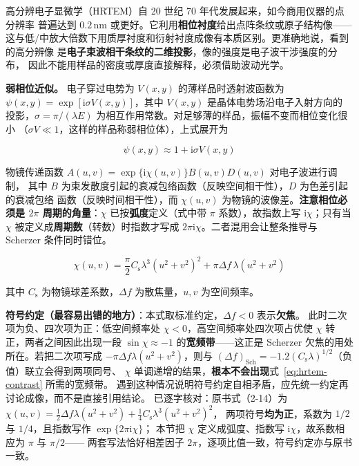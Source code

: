高分辨电子显微学（HRTEM）自 20 世纪 70 年代发展起来，如今商用仪器的点分辨率
普遍达到 $0.2$\,nm 或更好。它利用\textbf{相位衬度}给出点阵条纹或原子结构像——
这与低/中放大倍数下用质厚衬度和衍射衬度成像有本质区别。更准确地说，看到的高分辨像
是\textbf{电子束波相干条纹的二维投影}，像的强度是电子波干涉强度的分布，
因此不能用样品的密度或厚度直接解释，必须借助波动光学。

\textbf{弱相位近似。} 电子穿过电势为 $V(x,y)$ 的薄样品时透射波函数为
$\psi(x,y)=\exp[\mathrm{i}\sigma V(x,y)]$，其中 $V(x,y)$ 是晶体电势场沿电子入射方向的
投影，$\sigma=\pi/(\lambda E)$ 为相互作用常数。对足够薄的样品，振幅不变而相位变化很小
（$\sigma V\ll1$，这样的样品称弱相位体），上式展开为

\begin{equation}\label{eq:weak-phase}
\psi(x,y)\approx 1+\mathrm{i}\sigma V(x,y)
\end{equation}

物镜传递函数 $A(u,v)=\exp\{\mathrm{i}\chi(u,v)\}B(u,v)D(u,v)$ 对电子波进行调制，
其中 $B$ 为束发散度引起的衰减包络函数（反映空间相干性），$D$ 为色差引起的衰减包络
函数（反映时间相干性），而 $\chi(u,v)$ 为物镜的波像差。\textbf{注意相位必须是
$2\pi$ 周期的角量}：$\chi$ 已按\textbf{弧度}定义（式中带 $\pi$ 系数），故指数上写
$\mathrm{i}\chi$；只有当 $\chi$ 被定义成\textbf{周期数}（转数）时指数才写成
$2\pi\mathrm{i}\chi$。二者混用会让整条推导与 Scherzer 条件同时错位。

\begin{equation}\label{eq:chi}
\chi(u,v)=\frac{\pi}{2}C_{\mathrm{s}}\lambda^{3}(u^{2}+v^{2})^{2}
+\pi\Delta f\,\lambda(u^{2}+v^{2})
\end{equation}

其中 $C_{\mathrm{s}}$ 为物镜球差系数，$\Delta f$ 为散焦量，$u,v$ 为空间频率。

\textbf{符号约定（最容易出错的地方）}：本式取标准约定，$\Delta f<0$ 表示\textbf{欠焦}。
此时二次项为负、四次项为正：低空间频率处 $\chi<0$，高空间频率处四次项占优使 $\chi$
转正，两者之间因此出现一段 $\sin\chi\approx-1$ 的\textbf{宽频带}——这正是 Scherzer
欠焦的用处所在。若把二次项写成 $-\pi\Delta f\lambda(u^{2}+v^{2})$，则与
$(\Delta f)_{\mathrm{Sch}}=-1.2(C_{\mathrm{s}}\lambda)^{1/2}$（负值）联立会得到两项同号、
$\chi$ 单调递增的结果，\textbf{根本不会出现}式~\eqref{eq:hrtem-contrast} 所需的宽频带。
遇到这种情况说明符号约定自相矛盾，应先统一约定再讨论成像，而不是直接引用结论。
已逐字核对：原书式（2-14）为
$\chi(u,v)=\frac{1}{2}\Delta f\lambda(u^{2}+v^{2})+\frac{1}{4}C_{\mathrm{s}}\lambda^{3}(u^{2}+v^{2})^{2}$，
两项符号\textbf{均为正}，系数为 $1/2$ 与 $1/4$，且指数写作 $\exp\{2\pi\mathrm{i}\chi\}$；
本节把 $\chi$ 定义成弧度、指数写 $\mathrm{i}\chi$，故系数相应为 $\pi$ 与 $\pi/2$——
两套写法恰好相差因子 $2\pi$，逐项比值一致，符号约定亦与原书一致。


